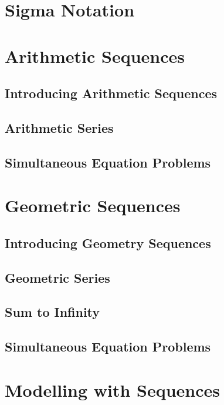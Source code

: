 \documentclass[../alevelmaths.tex]{subfiles}
\begin{document}
\section{Sigma Notation}
\section{Arithmetic Sequences}
\subsection*{Introducing Arithmetic Sequences}
\subsection*{Arithmetic Series}
\subsection*{Simultaneous Equation Problems}
\section{Geometric Sequences}
\subsection*{Introducing Geometry Sequences}
\subsection*{Geometric Series}
\subsection*{Sum to Infinity}
\subsection*{Simultaneous Equation Problems}
\section{Modelling with Sequences}
\end{document}

